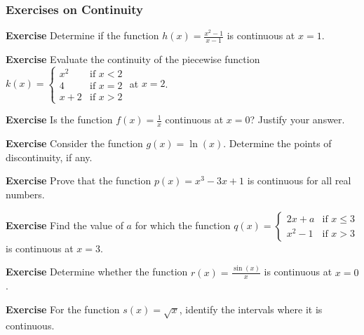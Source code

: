 \documentclass[a4paper,12pt]{book}
\newenvironment{exercise}[1][]
  {\par\medskip\noindent\textbf{Exercise #1} \rmfamily}
  {\medskip}
\begin{document}
\subsubsection*{Exercises on Continuity}

\begin{exercise}
Determine if the function \( h(x) = \frac{x^2 - 1}{x - 1} \) is continuous at \( x = 1 \).
\end{exercise}

\begin{exercise}
Evaluate the continuity of the piecewise function \( k(x) = 
\begin{cases} 
x^2 & \text{if } x < 2 \\
4 & \text{if } x = 2 \\
x + 2 & \text{if } x > 2 
\end{cases} \) at \( x = 2 \).
\end{exercise}

\begin{exercise}
Is the function \( f(x) = \frac{1}{x} \) continuous at \( x = 0 \)? Justify your answer.
\end{exercise}

\begin{exercise}
Consider the function \( g(x) = \ln(x) \). Determine the points of discontinuity, if any.
\end{exercise}

\begin{exercise}
Prove that the function \( p(x) = x^3 - 3x + 1 \) is continuous for all real numbers.
\end{exercise}

\begin{exercise}
Find the value of \( a \) for which the function \( q(x) = 
\begin{cases} 
2x + a & \text{if } x \leq 3 \\
x^2 - 1 & \text{if } x > 3 
\end{cases} \) is continuous at \( x = 3 \).
\end{exercise}

\begin{exercise}
Determine whether the function \( r(x) = \frac{\sin(x)}{x} \) is continuous at \( x = 0 \).
\end{exercise}

\begin{exercise}
For the function \( s(x) = \sqrt{x} \), identify the intervals where it is continuous.
\end{exercise}
\end{document}
